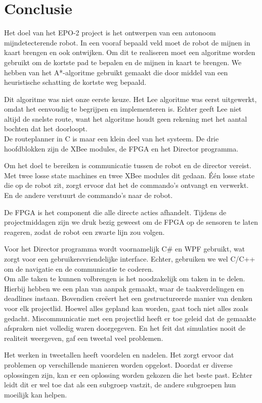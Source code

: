 \documentclass{report}
\begin{document}
\chapter{Conclusie}
\label{ch:conclusie}

Het doel van het EPO-2 project is het ontwerpen van een autonoom mijndetecterende robot. In een vooraf bepaald veld moet de robot de mijnen in kaart brengen en ook ontwijken. 
Om dit te realiseren moet een algoritme worden gebruikt om de kortste pad te bepalen en de mijnen in kaart te brengen. We hebben van het A*-algoritme gebruikt gemaakt die door middel van een heuristische schatting de kortste weg bepaald. 

Dit algoritme was niet onze eerste keuze. Het Lee algoritme was eerst uitgewerkt, omdat het eenvoudig te begrijpen en implementeren is. Echter geeft Lee niet altijd de snelste route, want het algoritme houdt geen rekening met het aantal bochten dat het doorloopt.\\

De routeplanner in C is maar een klein deel van het systeem. De drie hoofdblokken zijn de XBee modules, de FPGA en het Director programma. 

Om het doel te bereiken is communicatie tussen de robot en de director vereist. Met twee losse state machines en twee XBee modules dit gedaan. \'E\'en losse state die op de robot zit, zorgt ervoor dat het de commando's ontvangt en verwerkt. En de andere verstuurt de commando's naar de robot.

De FPGA is het component die alle directe acties afhandelt. Tijdens de projectmiddagen zijn we druk bezig geweest om de FPGA op de sensoren te laten reageren, zodat de robot een zwarte lijn zou volgen. 

Voor het Director programma wordt voornamelijk C\# en WPF gebruikt, wat zorgt voor een gebruikersvriendelijke interface. Echter, gebruiken we wel C/C++ om de navigatie en de communicatie te coderen.\\

Om alle taken te kunnen volbrengen is het noodzakelijk om taken in te delen. Hierbij hebben we een plan van aanpak gemaakt, waar de taakverdelingen en deadlines instaan. Bovendien cre\"eert het een gestructureerde manier van denken voor elk projectlid.
Hoewel alles gepland kan worden, gaat toch niet alles zoals gedacht. Miscommunicatie met een projectlid heeft er toe geleid dat de gemaakte afspraken niet volledig waren doorgegeven. En het feit dat simulaties nooit de realiteit weergeven, gaf een tweetal veel problemen.

Het werken in tweetallen heeft voordelen en nadelen. Het zorgt ervoor dat problemen op verschillende manieren worden opgelost. Doordat er diverse oplossingen zijn, kan er een oplossing worden gekozen die het beste past. Echter leidt dit er wel toe dat als een subgroep vastzit, de andere subgroepen hun moeilijk kan helpen.  
\end{document}

